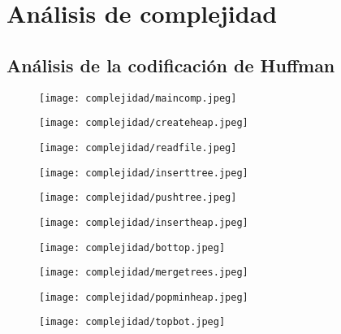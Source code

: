 \documentclass[12 pt]{report}
\begin{document}
\section{Análisis de complejidad}
\subsection{Análisis de la codificación de Huffman}
\begin{figure}[h!]
  \centering
  \texttt{[image: complejidad/maincomp.jpeg]}
  \caption{\label{fig:Main de la codificación}}
\end{figure}
\newpage
\begin{figure}[h!]
  \texttt{[image: complejidad/createheap.jpeg]}
  \caption{\label{fig:Reservar el espacio del montículo} }
\end{figure}
\begin{figure}[h!]
  \texttt{[image: complejidad/readfile.jpeg]}
  \caption{\label{fig:Leer bytes del archivo original}}
\end{figure}
\newpage
\begin{figure}[h!]
  \texttt{[image: complejidad/inserttree.jpeg]}
  \caption{\label{fig:Insertar nodos en la cola de prioridad} }
\end{figure}
\begin{figure}[h!]
  \texttt{[image: complejidad/pushtree.jpeg]}
  \caption{\label{fig:Insertar datos en los nodos} }
\end{figure}
\begin{figure}[h!]
  \texttt{[image: complejidad/insertheap.jpeg]}
  \caption{\label{fig:Insercion en la cola de prioridad} }
\end{figure}
\newpage
\begin{figure}[h!]
  \texttt{[image: complejidad/bottop.jpeg]}
  \caption{\label{fig:Hacer bottom top al montículo} }
\end{figure}
\begin{figure}[h!]
  \texttt{[image: complejidad/mergetrees.jpeg]}
  \caption{\label{fig:Unir todos los arboles en uno principal} }
\end{figure}
\begin{figure}[h!]
  \texttt{[image: complejidad/popminheap.jpeg]}
  \caption{\label{fig:Eliminar y devolver el menor elemento de la cola} }
\end{figure}
\newpage
\begin{figure}[h!]
  \texttt{[image: complejidad/topbot.jpeg]}
  \caption{\label{fig:Hacer top bottom al montículo} }
\end{figure}
\end{document}
